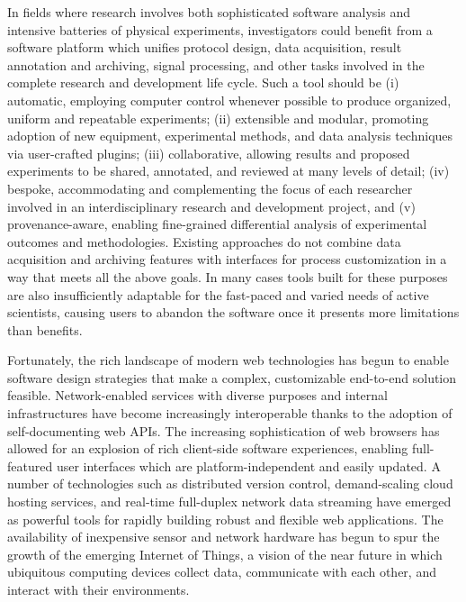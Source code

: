 In fields where research involves both sophisticated software analysis
and intensive batteries of physical experiments, investigators could
benefit from a software platform which unifies protocol design, data
acquisition, result annotation and archiving, signal processing, and
other tasks involved in the complete research and development life
cycle. Such a tool should be (i) automatic, employing computer control
whenever possible to produce organized, uniform and repeatable
experiments; (ii) extensible and modular, promoting adoption of new
equipment, experimental methods, and data analysis techniques via
user-crafted plugins; (iii) collaborative, allowing results and
proposed experiments to be shared, annotated, and reviewed at many
levels of detail; (iv) bespoke, accommodating and complementing the
focus of each researcher involved in an interdisciplinary research and
development project, and (v) provenance-aware, enabling fine-grained
differential analysis of experimental outcomes and
methodologies. Existing approaches do not combine data acquisition and
archiving features with interfaces for process customization in a way
that meets all the above goals. In many cases tools built for
these purposes are also insufficiently adaptable for the fast-paced
and varied needs of active scientists, causing users to abandon the
software once it presents more limitations than benefits.

Fortunately, the rich landscape of modern web technologies has begun
to enable software design strategies that make a complex, customizable
end-to-end solution feasible. Network-enabled services with
diverse purposes and internal infrastructures have become increasingly
interoperable thanks to the adoption of self-documenting web APIs. The
increasing sophistication of web browsers has allowed for an
explosion of rich client-side software experiences, enabling
full-featured user interfaces which are platform-independent and easily
updated. A number of technologies such as distributed version control,
demand-scaling cloud hosting services, and real-time full-duplex
network data streaming have emerged as powerful tools for
rapidly building robust and flexible web applications. The
availability of inexpensive sensor and network hardware has begun to
spur the growth of the emerging Internet of Things, a vision of the
near future in which ubiquitous computing devices collect data,
communicate with each other, and interact with their environments.

